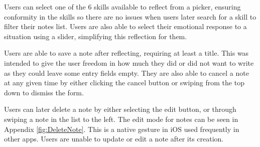 \documentclass{l4proj}
\begin{document}
Users can select one of the 6 skills available to reflect from a picker, ensuring conformity in the skills so there are no issues when users later search for a skill to filter their notes list. Users are also able to select their emotional response to a situation using a slider, simplifying this reflection for them. 

Users are able to save a note after reflecting, requiring at least a title. This was intended to give the user freedom in how much they did or did not want to write as they could leave some entry fields empty. They are also able to cancel a note at any given time by either clicking the cancel button or swiping from the top down to dismiss the form. 

Users can later delete a note by either selecting the edit button, or through swiping a note in the list to the left. The edit mode for notes can be seen in Appendix \ref{fig:DeleteNote}. This is a native gesture in iOS used frequently in other apps. Users are unable to update or edit a note after its creation.
\end{document}

